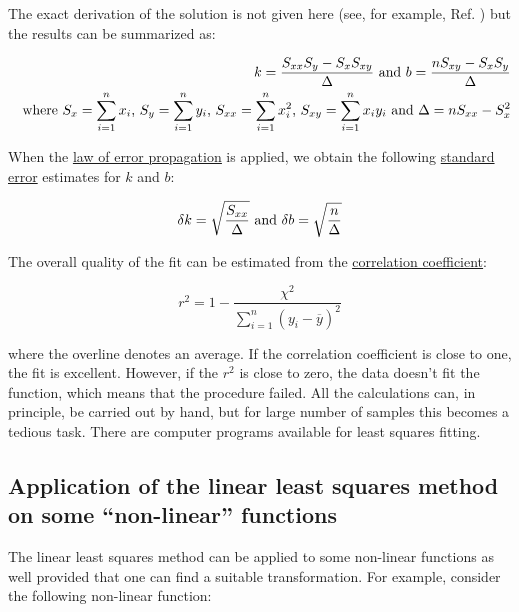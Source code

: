 \documentclass[byrevtex,amssymb,aps,pra,floatfix,letterpaper]{revtex4}
\begin{document}
The exact derivation of the solution is not given here (see, for example, Ref. \cite{NUMREP}) but the results can be summarized as:

\begin{eqnarray}
\label{eq17}
& & k = \frac{S_{xx}S_y - S_xS_{xy}}{\Delta}\textnormal{ and }b = \frac{nS_{xy}-S_xS_y}{\Delta}\\
\nonumber
& & \textnormal{where }S_x = \sum\limits_{i=1}^{n} x_i\textnormal{, }S_y = \sum\limits_{i=1}^{n} y_i\textnormal{, }S_{xx} = \sum\limits_{i=1}^{n} x_i^2\textnormal{, } S_{xy} = \sum\limits_{i=1}^{n} x_iy_i\textnormal{ and }\Delta = nS_{xx} - S_x^2
\end{eqnarray}

\noindent
When the \href{http://en.wikipedia.org/wiki/Error_propagation}{\underline{law of error propagation}} is applied, we obtain the following \href{http://en.wikipedia.org/wiki/Standard_error_\%28statistics\%29}{standard error} estimates for $k$ and $b$:

\begin{equation}
\label{eq18}
\delta k = \sqrt{\frac{S_{xx}}{\Delta}}\textnormal{ and }\delta b = \sqrt{\frac{n}{\Delta}}
\end{equation}

\noindent
The overall quality of the fit can be estimated from the \href{http://en.wikipedia.org/wiki/Coefficient_of_determination}{\underline{correlation coefficient}}:

\begin{equation}
\label{eq19}
r^2 = 1 - \frac{\chi^2}{\sum\limits_{i=1}^{n}\left(y_i - \overline{y}\right)^2}
\end{equation}

\noindent
where the overline denotes an average. If the correlation coefficient is close to one, the fit is excellent. However, if the $r^2$ is close to zero, the data doesn’t fit the function, which means that the
procedure failed. All the calculations can, in principle, be carried out by hand, but for large number of samples this becomes a tedious task. There are computer programs available for least squares fitting.

\subsection{Application of the linear least squares method on some ``non-linear'' functions}

The linear least squares method can be applied to some non-linear functions as well provided that one can find a suitable transformation. For example, consider the following non-linear function:
\end{document}
